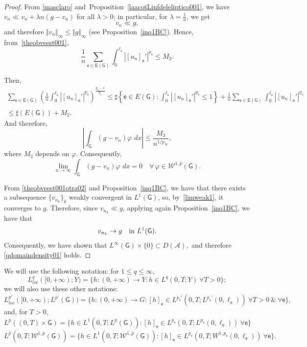 \documentclass[reqno,12pt]{amsart}
\def\e{\mathsf{e}} 	%
\newcommand{\G}{\mathsf{G}}	%
\newcommand{\E}{\mathsf{E}}	%
\numberwithin{equation}{section} %
\begin{document}
\begin{proof}
From \eqref{masclaro} and~Proposition~\ref{laacotLinfdeleliptico001}, we have    $v_n\ll v_n+\lambda n(g-v_n)$ for all $\lambda>0$; in particular, for $\lambda=\frac{1}{n}$, we get 
\begin{equation}\label{theobveest001otra02}v_n\ll g,
\end{equation}
and therefore $\Vert v_n\Vert_\infty\le \Vert g\Vert_\infty$ (see Proposition~\ref{inq1BC}). Hence, from~\eqref{theobveest001},
\begin{equation}\label{theobveest001otra01}\frac{1}{n}\sum_{\e \in\E(\G)}\int_{0}^{\ell_\e}|[u_n]_\e'|^{p_\e}       \leq M_2.\end{equation}

Then, 
$$\begin{array}{c}
\displaystyle\sum_{\e \in\E(\G)}  \left( \frac{1}{n} \int_{0}^{\ell_\e}|[u_n]_\e'|^{p_\e} \right)^{\frac{p_\e -1}{p_\e}} \leq \sharp\left\{\e\in E(\G) :  \int_{0}^{\ell_\e}|[u_n]_\e'|^{p_\e} \leq 1 \right\} + \frac{1}{n}\sum_{\e \in\E(\G)}\int_{0}^{\ell_\e}|[u_n]_\e'|^{p_\e}\\ \\
\leq \sharp(E(\G)) +M_2.
\end{array}$$
And therefore, 
$$\left\vert \int_\G (g - v_n) \varphi \, \,dx \right\vert \leq   \frac{M_3}{n^{1/p_{\infty}}},$$
where $M_3$ depends on $\varphi$.
Consequently,
\begin{equation}\label{limweak1}
\lim_{n \to \infty}  \int_\G (g - v_n) \varphi \, \,dx =0 \quad \forall \, \varphi   \in \mathcal{W}^{1,\overline{p}}(\G).
\end{equation}

 From \eqref{theobveest001otra02} and Proposition~\ref{inq1BC}, we have that there exists a subsequence $\{v_{n_k}\}_k$   weakly convergent in $L^1(\G)$, so, by~\eqref{limweak1}, it converges to $g$. Therefore, since $v_{n_k}\ll g$, applying again  Proposition~\ref{inq1BC}, we have that 
 $$v_{n_k}\to g\quad\hbox{in } L^{1}(\G).$$
Consequently, we have shown that $L^\infty(\G)\times\{0\}\subset \overline{D(\mathcal{A})},$ and therefore \eqref{qdomaindensity01} holds.\end{proof}

  We will use the following notation:  for $1\le q\le \infty$, $$L^q_{loc}([0,+\infty);Y)=\{h:(0,+\infty)\to Y:h\in L^q(0,T;Y)  \ \forall T>0\};$$  
  we will also use these other notations:
  $$L^{\overline{p'}}_{loc}([0,+\infty);  L^{\overline{p'}}(\G))
=\{h:(0,+\infty)\to G: [h]_\e\in L^{p_\e'}(0,T;L^{p_\e'}(0,\ell_\e))\ \forall T>0 \   \&\ \forall \e\},$$
and, for $T>0$,
$$L^{\overline{p}}((0,T)\times\G)=\{h\in L^1(0,T;L^{\overline{p}}(\G)): [h]_\e\in L^{p_\e}(0,T;L^{p_\e}(0,\ell_\e)) \ \forall \e\}$$
  $$L^{\overline{p}}(0,T;  \mathcal{W}^{1,\overline{p}}(\G))=\{h\in L^{1}(0,T;  \mathcal{W}^{1,\overline{p}}(\G)): [h]_\e\in L^{p_\e}(0,T;W^{1,p_\e}(0,\ell_\e))\ \forall \e\}.$$
\end{document}
